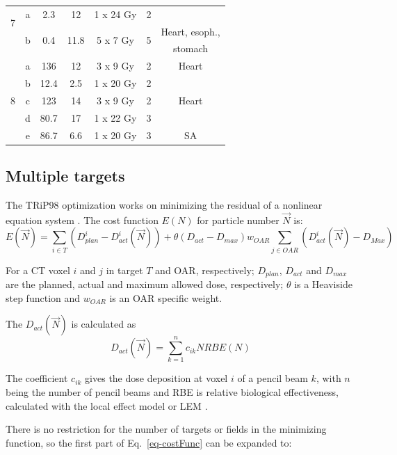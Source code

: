 \documentclass[type=dr, dr=rernat, accentcolor=tud7b,colorbacktitle, bigchapter, openright, twoside, 12pt ]{tudthesis}
\begin{document}
\begin{table}[H]
\begin{tabular}{c|c|c|c|c|c|c}
		 \hline
		 \multirow{2}{*}{7} & a & 2.3 & 12  & 1 x 24 Gy & 2 &\\
		 & \multirow{2}{*}{b} & \multirow{2}{*}{0.4} & \multirow{2}{*}{11.8}  & \multirow{2}{*}{5 x 7 Gy} & \multirow{2}{*}{5} & Heart, esoph., \\
		 & & & & & & stomach \\
		 \hline
		 \multirow{5}{*}{8} & a & 136 & 12  & 3 x 9 Gy & 2 & Heart\\
		  & b & 12.4 & 2.5  & 1 x 20 Gy & 2 &\\
		  & c & 123 & 14  & 3 x 9 Gy & 2  &Heart \\
		 & d & 80.7 & 17  & 1 x 22 Gy & 3  &\\
		 & e & 86.7 & 6.6  & 1 x 20 Gy & 3 & SA \\
		\hline\hline
	\end{tabular}
	\label{tab:patdata2}
\end{table}


\newpage

\subsection{Multiple targets}

The TRiP98 optimization works on minimizing the residual of a nonlinear equation system \cite{Kraemer2000a}. The cost function $E(N)$ for particle number $\vec{N}$ is:
\begin{equation}
\label{eq-costFunc}
 E(\vec{N}) = \sum_{i\in T} \left( D_{plan}^{i} - D_{act}^{i}(\vec{N})\right) +  \theta(D_{act}-D_{max})w_{OAR}\sum_{j\in OAR} \left( D_{act}^{i}(\vec{N}) - D_{Max} \right)
\end{equation}

For a CT voxel $i$ and $j$ in target $T$ and OAR, respectively; $ D_{plan}$, $D_{act}$ and $D_{max}$ are the planned, actual and maximum allowed dose, respectively; $\theta$ is a 
Heaviside step function and $w_{OAR}$ is an OAR specific weight.

The $D_{act}(\vec{N})$ is calculated as
\begin{equation}
 D_{act}(\vec{N}) = \sum_{k=1}^n c_{ik}N RBE(N)
\end{equation}

The coefficient $c_{ik}$ gives the dose deposition at voxel $i$ of a pencil beam $k$, 
with $n$ being the number of pencil beams and RBE is relative biological effectiveness, calculated with the local effect model or LEM \cite{Elsaesser2010} . 

There is no restriction for the number of targets or fields in the minimizing function, so the first part of Eq.~\ref{eq-costFunc} can be expanded to:
\end{document}
